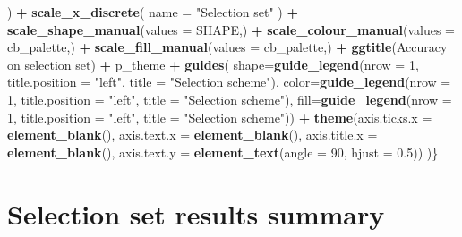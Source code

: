 \documentclass[
]{book}
\newenvironment{Shaded}{\begin{snugshade}}{\end{snugshade}}
\newcommand{\AttributeTok}[1]{\textcolor[rgb]{0.13,0.29,0.53}{#1}}
\newcommand{\DecValTok}[1]{\textcolor[rgb]{0.00,0.00,0.81}{#1}}
\newcommand{\FloatTok}[1]{\textcolor[rgb]{0.00,0.00,0.81}{#1}}
\newcommand{\FunctionTok}[1]{\textcolor[rgb]{0.13,0.29,0.53}{\textbf{#1}}}
\newcommand{\NormalTok}[1]{#1}
\newcommand{\SpecialCharTok}[1]{\textcolor[rgb]{0.81,0.36,0.00}{\textbf{#1}}}
\newcommand{\StringTok}[1]{\textcolor[rgb]{0.31,0.60,0.02}{#1}}
\begin{document}
\begin{Shaded}
\begin{Highlighting}[]
\NormalTok{    ) }\SpecialCharTok{+}
    \FunctionTok{scale\_x\_discrete}\NormalTok{(}
    \AttributeTok{name =} \StringTok{"Selection set"}
\NormalTok{    ) }\SpecialCharTok{+}
    \FunctionTok{scale\_shape\_manual}\NormalTok{(}\AttributeTok{values =}\NormalTok{ SHAPE,) }\SpecialCharTok{+}
    \FunctionTok{scale\_colour\_manual}\NormalTok{(}\AttributeTok{values =}\NormalTok{ cb\_palette,) }\SpecialCharTok{+}
    \FunctionTok{scale\_fill\_manual}\NormalTok{(}\AttributeTok{values =}\NormalTok{ cb\_palette,) }\SpecialCharTok{+}
    \FunctionTok{ggtitle}\NormalTok{(}\StringTok{\textquotesingle{}Accuracy on selection set\textquotesingle{}}\NormalTok{) }\SpecialCharTok{+}
\NormalTok{    p\_theme }\SpecialCharTok{+}
    \FunctionTok{guides}\NormalTok{(}
    \AttributeTok{shape=}\FunctionTok{guide\_legend}\NormalTok{(}\AttributeTok{nrow =} \DecValTok{1}\NormalTok{, }\AttributeTok{title.position =} \StringTok{"left"}\NormalTok{,}
                        \AttributeTok{title =} \StringTok{"Selection scheme"}\NormalTok{),}
    \AttributeTok{color=}\FunctionTok{guide\_legend}\NormalTok{(}\AttributeTok{nrow =} \DecValTok{1}\NormalTok{, }\AttributeTok{title.position =} \StringTok{"left"}\NormalTok{,}
                        \AttributeTok{title =} \StringTok{"Selection scheme"}\NormalTok{),}
    \AttributeTok{fill=}\FunctionTok{guide\_legend}\NormalTok{(}\AttributeTok{nrow =} \DecValTok{1}\NormalTok{, }\AttributeTok{title.position =} \StringTok{"left"}\NormalTok{,}
                        \AttributeTok{title =} \StringTok{"Selection scheme"}\NormalTok{)) }\SpecialCharTok{+}
    \FunctionTok{theme}\NormalTok{(}\AttributeTok{axis.ticks.x =} \FunctionTok{element\_blank}\NormalTok{(),}
            \AttributeTok{axis.text.x =} \FunctionTok{element\_blank}\NormalTok{(),}
            \AttributeTok{axis.title.x =} \FunctionTok{element\_blank}\NormalTok{(),}
            \AttributeTok{axis.text.y =} \FunctionTok{element\_text}\NormalTok{(}\AttributeTok{angle =} \DecValTok{90}\NormalTok{, }\AttributeTok{hjust =} \FloatTok{0.5}\NormalTok{))}
\NormalTok{)\}}
\end{Highlighting}
\end{Shaded}

\hypertarget{selection-set-results-summary}{%
\section{Selection set results summary}\label{selection-set-results-summary}}
\end{document}
